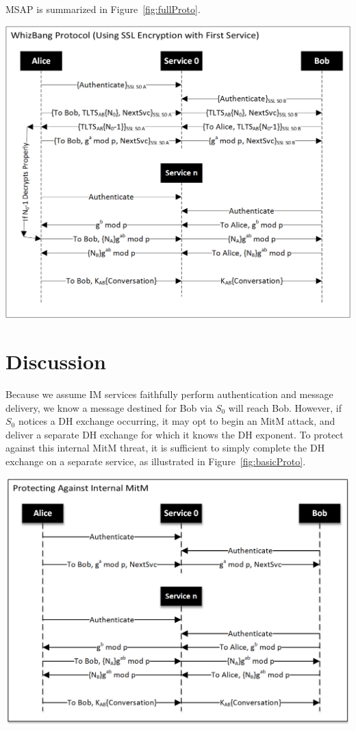 \documentclass[twoside,10pt]{article}
\newenvironment{Figure}
  {\par\medskip\noindent\minipage{\linewidth}}
  {\endminipage\par\medskip}
\begin{document}
\begin{multicols}{2}
MSAP is summarized in Figure~\ref{fig:fullProto}.
\begin{Figure}
  \centering
  \includegraphics[width=\textwidth]{ProtocolDiagramBW}
  \label{fig:fullProto}
\end{Figure}


\section{Discussion}
Because we assume IM services faithfully perform authentication and message delivery, we know a message destined for Bob via $S_0$ will reach Bob.  However, if $S_0$ notices a DH exchange occurring, it may opt to begin an MitM attack, and deliver a separate DH exchange for which it knows the DH exponent.  To protect against this internal MitM threat, it is sufficient to simply complete the DH exchange on a separate service, as illustrated in Figure~\ref{fig:basicProto}.
\begin{Figure}
  \centering
  \includegraphics[width=\textwidth]{ProtectInternalMitMDiagramBW.png}
  \label{fig:basicProto}
\end{Figure}


\end{multicols}
\end{document}
